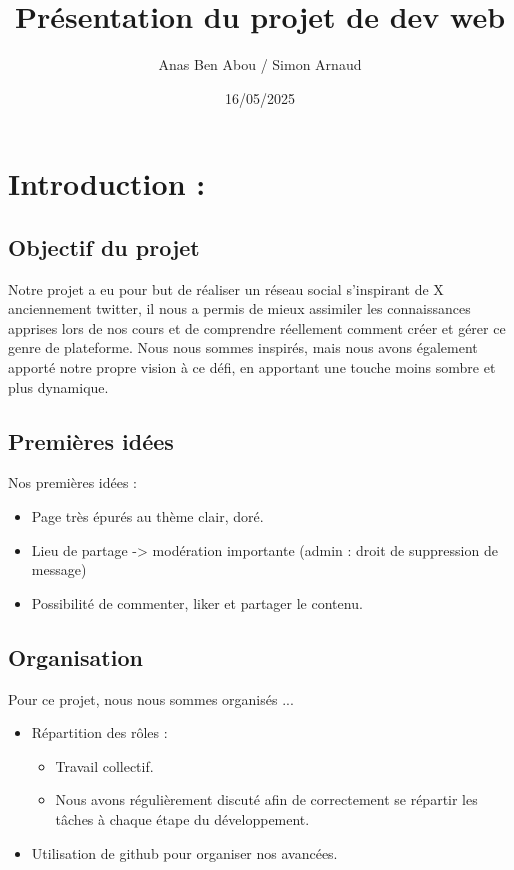 \documentclass[12pt,a4paper]{article}
\title{Présentation du projet de dev web} %
\author{Anas Ben Abou / Simon Arnaud} %
\date{16/05/2025} %
\begin{document}
\maketitle

\tableofcontents

\newpage

\section{Introduction :}
\subsection{Objectif du projet}
  Notre projet a eu pour but de réaliser un réseau social s'inspirant de X anciennement twitter, il nous a permis de mieux assimiler les connaissances apprises lors de nos cours et de comprendre réellement comment créer et gérer ce genre de plateforme. Nous nous sommes inspirés, mais nous avons également apporté notre propre vision à ce défi, en apportant une touche moins sombre et plus dynamique.\\
  
  
\subsection{Premières idées}
  Nos premières idées :
  \begin{itemize}
  \item Page très épurés au thème clair, doré.
  \item Lieu de partage -> modération importante (admin : droit de suppression de message)
  \item Possibilité de commenter, liker et partager le contenu.
  \end{itemize}
  

\subsection{Organisation}
  Pour ce projet, nous nous sommes organisés ...
  \begin{itemize}
  \item Répartition des rôles :
      \begin{itemize}
      \item Travail collectif. 
      \item Nous avons régulièrement discuté afin de correctement se répartir les tâches à chaque étape du développement.
      \end{itemize}
  \item Utilisation de github pour organiser nos avancées.
  \end{itemize}
\end{document}
